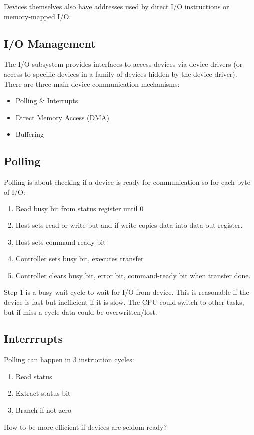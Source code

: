 \documentclass[11pt]{article}
\begin{document}
Devices themselves also have addresses used by direct I/O instructions or memory-mapped I/O.

\subsection{I/O Management}
\label{sec:orgfc8e422}
The I/O subsystem provides interfaces to access devices via device drivers (or access to specific devices in a family of devices hidden by the device driver).
There are three main device communication mechanisms:
\begin{itemize}
\item Polling \& Interrupts
\item Direct Memory Access (DMA)
\item Buffering
\end{itemize}

\subsection{Polling}
\label{sec:org0ec5291}
Polling is about checking if a device is ready for communication so for each byte of I/O:
\begin{enumerate}
\item Read busy bit from status register until 0
\item Host sets read or write but and if write copies data into data-out register.
\item Host sets command-ready bit
\item Controller sets busy bit, executes transfer
\item Controller clears busy bit, error bit, command-ready bit when transfer done.
\end{enumerate}
Step 1 is a busy-wait cycle to wait for I/O from device.
This is reasonable if the device is fast but inefficient if it is slow.
The CPU could switch to other tasks, but if miss a cycle data could be overwritten/lost.

\subsection{Interrrupts}
\label{sec:org57e3c12}
Polling can happen in 3 instruction cycles:
\begin{enumerate}
\item Read status
\item Extract status bit
\item Branch if not zero
\end{enumerate}
How to be more efficient if devices are seldom ready?
\end{document}
